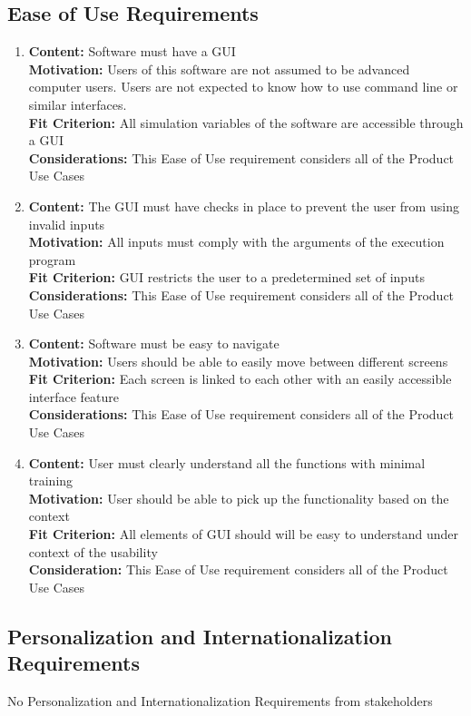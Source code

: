 \documentclass[paper=letter, fontsize=10pt]{scrartcl}
\numberwithin{equation}{section}		%
\numberwithin{figure}{section}			%
\numberwithin{table}{section}				%
\begin{document}
\subsection{Ease of Use Requirements}
\begin{enumerate}
	\item \textbf{Content:} Software must have a GUI
	\\	  \textbf{Motivation:} Users of this software are not assumed to be advanced computer users. Users are not expected to know how to use command line or similar interfaces. 
	\\	  \textbf{Fit Criterion:} All simulation variables of the software are accessible through a GUI
	\\	  \textbf{Considerations:} This Ease of Use requirement considers all of the Product Use Cases
	\item \textbf{Content:} The GUI must have checks in place to prevent the user from using invalid inputs 
	\\	  \textbf{Motivation:} All inputs must comply with the arguments of the execution program
	\\	  \textbf{Fit Criterion:} GUI restricts the user to a predetermined set of inputs
	\\	  \textbf{Considerations:} This Ease of Use requirement considers all of the Product Use Cases
	\item \textbf{Content:} Software must be easy to navigate
	\\	  \textbf{Motivation:} Users should be able to easily move between different screens
	\\	  \textbf{Fit Criterion:} Each screen is linked to each other with an easily accessible interface feature
	\\	  \textbf{Considerations:} This Ease of Use requirement considers all of the Product Use Cases
	\item \textbf{Content:} User must clearly understand all the functions with minimal training
	\\	  \textbf{Motivation:} User should be able to pick up the functionality based on the context
	\\	  \textbf{Fit Criterion:} All elements of GUI should will be easy to understand under context of the usability
	\\	  \textbf{Consideration:} This Ease of Use requirement considers all of the Product Use Cases
\end{enumerate}
\subsection{Personalization and Internationalization Requirements}
No Personalization and Internationalization Requirements from stakeholders
\end{document}
